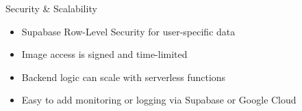 \documentclass{beamer}
\begin{document}
\begin{frame}{Security \& Scalability}
    \begin{itemize}
        \item Supabase Row-Level Security for user-specific data
        \item Image access is signed and time-limited
        \item Backend logic can scale with serverless functions
        \item Easy to add monitoring or logging via Supabase or Google Cloud
    \end{itemize}
\end{frame}
\end{document}
